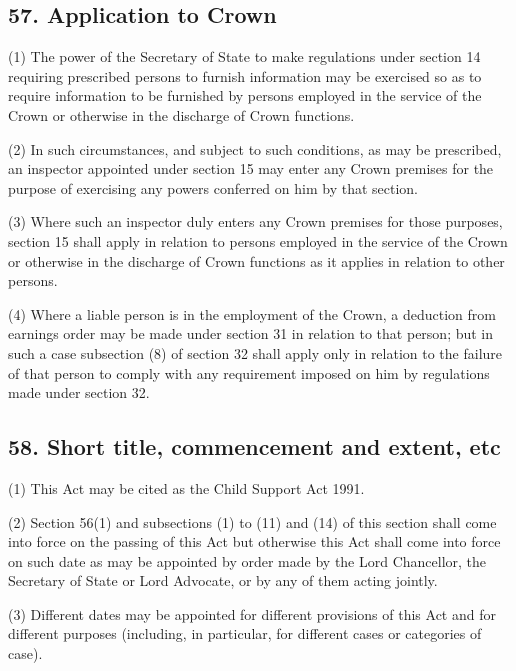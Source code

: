 \documentclass[12pt,a4paper]{article}
\begin{document}

\subsection{57. Application to Crown}

(1) The power of the Secretary of State to make regulations under section 14 requiring prescribed persons to furnish information may be exercised so as to require information to be furnished by persons employed in the service of the Crown or otherwise in the discharge of Crown functions.

(2) In such circumstances, and subject to such conditions, as may be prescribed, an inspector appointed under section 15 may enter any Crown premises for the purpose of exercising any powers conferred on him by that section.

(3) Where such an inspector duly enters any Crown premises for those purposes, section 15 shall apply in relation to persons employed in the service of the Crown or otherwise in the discharge of Crown functions as it applies in relation to other persons.

(4) Where a liable person is in the employment of the Crown, a deduction from earnings order may be made under section 31 in relation to that person; but in such a case subsection (8)  of section 32 shall apply only in relation to the failure of that person to comply with any requirement imposed on him by regulations made under section 32.


\subsection{58. Short title, commencement and extent, etc}

(1) This Act may be cited as the Child Support Act 1991.

(2) Section 56(1)  and subsections (1)  to (11)  and (14)  of this section shall come into force on the passing of this Act but otherwise this Act shall come into force on such date as may be appointed by order made by the Lord Chancellor, the Secretary of State or Lord Advocate, or by any of them acting jointly.

(3) Different dates may be appointed for different provisions of this Act and for different purposes (including, in particular, for different cases or categories of case).
\end{document}
